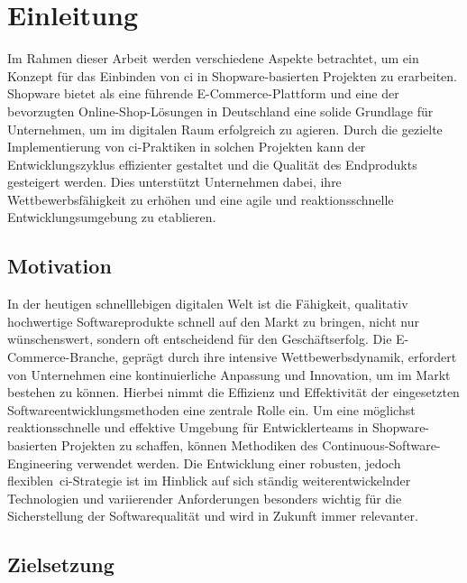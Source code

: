
\section{Einleitung} \label{sec:01-introduction}

Im Rahmen dieser Arbeit werden verschiedene Aspekte betrachtet, um ein Konzept für das Einbinden von
\acrfull{ci} in Shopware-basierten Projekten zu erarbeiten.
Shopware bietet als eine führende E-Commerce-Plattform und eine der bevorzugten Online-Shop-Lösungen in
Deutschland eine solide Grundlage für Unternehmen, um im digitalen Raum
erfolgreich zu agieren.
Durch die gezielte Implementierung von \acrshort{ci}-Praktiken in solchen Projekten kann der Entwicklungszyklus
effizienter gestaltet und die Qualität des Endprodukts gesteigert werden.
Dies unterstützt Unternehmen dabei, ihre Wettbewerbsfähigkeit zu erhöhen und eine agile und reaktionsschnelle
Entwicklungsumgebung zu etablieren.

\subsection{Motivation} \label{subsec:01-introduction-1}

In der heutigen schnelllebigen digitalen Welt ist die Fähigkeit, qualitativ hochwertige Softwareprodukte schnell auf den
Markt zu bringen, nicht nur wünschenswert, sondern oft entscheidend für den Geschäftserfolg.
Die E-Commerce-Branche, geprägt durch ihre intensive Wettbewerbsdynamik, erfordert von Unternehmen eine kontinuierliche
Anpassung und Innovation, um im Markt bestehen zu können.
Hierbei nimmt die Effizienz und Effektivität der eingesetzten Softwareentwicklungsmethoden eine zentrale Rolle ein.
Um eine möglichst reaktionsschnelle und effektive Umgebung für Entwicklerteams in Shopware-basierten Projekten zu
schaffen, können Methodiken des Continuous-Software-Engineering verwendet werden.
Die Entwicklung einer robusten, jedoch flexiblen\ \acrshort{ci}-Strategie ist im Hinblick auf sich ständig
weiterentwickelnder Technologien und variierender Anforderungen besonders wichtig für die Sicherstellung der
Softwarequalität und wird in Zukunft immer relevanter.

\subsection{Zielsetzung} \label{subsec:01-introduction-2}

